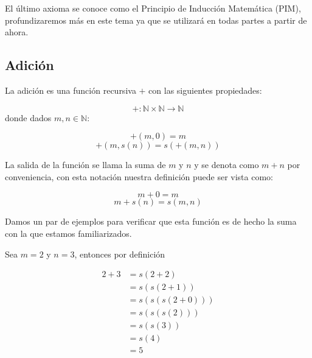 \documentclass{report}
\begin{document}
    El último axioma se conoce como el Principio de Inducción Matemática (PIM), profundizaremos más en este tema ya que se utilizará en todas partes a partir de ahora.

    \subsection*{Adición}

    La adición es una función recursiva $+$ con las siguientes propiedades:

    $$+: \mathbb{N}\times \mathbb{N} \to \mathbb{N}$$ donde dados $m,n \in \mathbb{N}$:

    $$+(m,0) = m$$
    $$+(m,s(n)) = s(+(m,n))$$

    La salida de la función se llama la suma de $m$ y $n$ y se denota como $m+n$ por conveniencia, con esta notación nuestra definición puede ser vista como:

    $$m+0 = m$$
    $$m + s(n) = s(m, n)$$

    Damos un par de ejemplos para verificar que esta función es de hecho la suma con la que estamos familiarizados.

    \begin{Example}
        Sea $m=2$ y $n=3$, entonces por definición

        \begin{align*}
            2+3 &= s(2+2)\\
            &= s(s(2+1))\\
            &= s(s(s(2+0)))\\
            &= s(s(s(2)))\\
            &= s(s(3))\\
            &= s(4)\\
            &= 5
        \end{align*}
    \end{Example}
\end{document}
